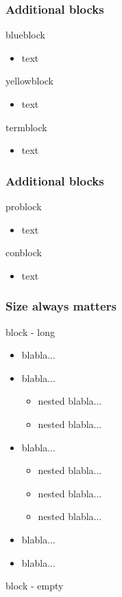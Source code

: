 \documentclass[slidestop,compress,9pt,aspectratio=43]{beamer}
\begin{document}
\begin{frame}
\frametitle{Additional blocks}
\begin{blueblock}{blueblock}
\begin{itemize} \item text \end{itemize}
\end{blueblock}
\begin{yellowblock}{yellowblock}
\begin{itemize} \item text \end{itemize}
\end{yellowblock}
\begin{termblock}{termblock}
\begin{itemize} \item text \end{itemize}
\end{termblock}
\end{frame}

\begin{frame}
\frametitle{Additional blocks}
\begin{problock}{problock}
\begin{itemize} \item text \end{itemize}
\end{problock}
\begin{conblock}{conblock}
\begin{itemize} \item text \end{itemize}
\end{conblock}
\end{frame}

\begin{frame}
\frametitle{Size always matters}
\begin{block}{block - long}
  \begin{itemize}
    \item blabla...
    \item blabla...
    \begin{itemize}
      \item nested blabla...
      \item nested blabla...
    \end{itemize}
    \item blabla...
    \begin{itemize}
    \item nested blabla...
    \item nested blabla...
    \item nested blabla...
    \end{itemize}
    \item blabla...
    \item blabla...
  \end{itemize}
\end{block}
\begin{block}{block - empty}
\end{block}
\end{frame}
\end{document}
